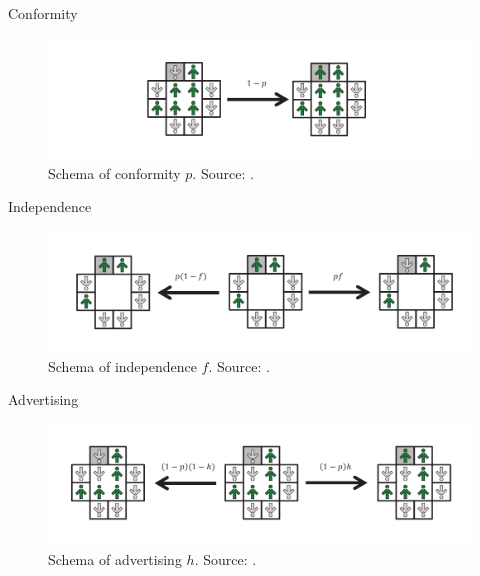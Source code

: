 \documentclass[10pt]{beamer}
\begin{document}
\begin{frame}{Conformity}
	\begin{figure}
		\includegraphics[width=\textwidth]{../resources/images/conformity.png}
		\caption{Schema of conformity $p$. Source: \cite{article}.}
	\end{figure}
\end{frame}

\begin{frame}{Independence}
	\begin{figure}
		\includegraphics[width=\textwidth]{../resources/images/flexibility.png}
		\caption{Schema of independence $f$. Source: \cite{article}.}
	\end{figure}
\end{frame}

\begin{frame}{Advertising}
	\begin{figure}
		\includegraphics[width=\textwidth]{../resources/images/advertising.png}
		\caption{Schema of advertising $h$. Source: \cite{article}.}
	\end{figure}
\end{frame}
\end{document}
